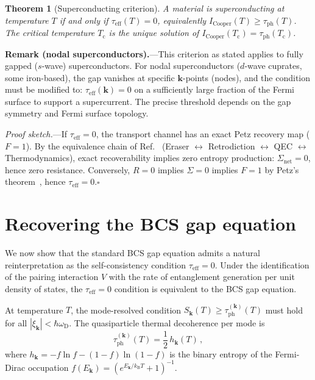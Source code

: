 \documentclass[prb,twocolumn,superscriptaddress,longbibliography,floatfix]{revtex4-2}
\newtheorem{theorem}{Theorem}
\newcommand{\kB}{k_{\mathrm{B}}}
\newcommand{\tauasym}{\tau}
\newcommand{\taueff}{\tauasym_{\mathrm{eff}}}
\newcommand{\taudec}{\tauasym_{\mathrm{ph}}}
\newcommand{\Icoop}{I_{\mathrm{Cooper}}}
\newcommand{\Tc}{T_{\mathrm{c}}}
\newcommand{\oD}{\omega_{\mathrm{D}}}
\newcommand{\Ek}{E_{\bm{k}}}
\newcommand{\xik}{\xi_{\bm{k}}}
\begin{document}
\begin{theorem}[Superconducting criterion]
\label{thm:sc}
A material is superconducting at temperature $T$ if and only if
$\taueff(T) = 0$, equivalently $\Icoop(T) \geq \taudec(T)$.
The critical temperature $\Tc$ is the unique solution of
$\Icoop(\Tc) = \taudec(\Tc)$.
\end{theorem}

\textbf{Remark (nodal superconductors).}---This criterion as
stated applies to fully gapped ($s$-wave) superconductors.  For
nodal superconductors ($d$-wave cuprates, some iron-based), the
gap vanishes at specific $\bm{k}$-points (nodes), and the
condition must be modified to: $\taueff(\bm{k}) = 0$ on a
sufficiently large fraction of the Fermi surface to support a
supercurrent.  The precise threshold depends on the gap symmetry
and Fermi surface topology.

\emph{Proof sketch.}---If $\taueff = 0$, the transport channel
has an exact Petz recovery map ($F=1$).  By the equivalence chain
of Ref.~\cite{Huang2026} (Eraser $\leftrightarrow$ Retrodiction
$\leftrightarrow$ QEC $\leftrightarrow$ Thermodynamics), exact
recoverability implies zero entropy production:
$\Sigma_{\mathrm{net}} = 0$, hence zero resistance.
Conversely, $R = 0$ implies $\Sigma = 0$ implies
$F = 1$ by Petz's theorem~\cite{Petz1988}, hence
$\taueff = 0$.\hfill$\square$

\section{Recovering the BCS gap equation}
\label{sec:gap}

We now show that the standard BCS gap equation admits a natural
reinterpretation as the self-consistency condition $\taueff = 0$.
Under the identification of the pairing interaction $V$ with the
rate of entanglement generation per unit density of states, the
$\taueff = 0$ condition is equivalent to the BCS gap equation.

At temperature $T$, the mode-resolved condition
$S_{\bm{k}}(T) \geq \taudec^{(\bm{k})}(T)$ must hold for
all $|\xik| < \hbar\oD$.  The quasiparticle thermal decoherence
per mode is
\begin{equation}\label{eq:tau_mode}
  \taudec^{(\bm{k})}(T) = \frac{1}{2}\, h_{\bm{k}}(T)\,,
\end{equation}
where $h_{\bm{k}} = -f\ln f - (1-f)\ln(1-f)$ is the binary
entropy of the Fermi-Dirac occupation
$f(\Ek) = (e^{\Ek/\kB T} + 1)^{-1}$.
\end{document}
